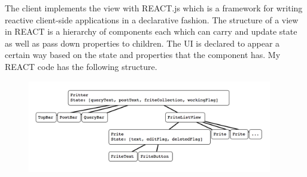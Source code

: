 \documentclass{amsart}
\begin{document}
The client implements the view with REACT.js which is a framework for writing reactive client-side
applications in a declarative fashion. The structure of a view in REACT is a hierarchy of components
each which can carry and update state as well as pass down properties to children. The UI is declared
to appear a certain way based on the state and properties that the component has. My REACT code has
the following structure.
\begin{figure}[htbp]
    \centering
    \includegraphics[width=0.95\textwidth]{reacttree}
\end{figure}
\end{document}
